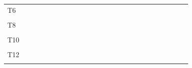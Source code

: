 \documentclass[
]{article}
\begin{document}
\begin{longtable}[l]{lllllllllllllllllllllllll}
\addlinespace
T6 &  &  &  &  &  &  &  &  &  &  &  &  &  &  &  &  &  &  &  &  &  &  &  & \\
\cellcolor{gray!6}{T7} & \cellcolor{gray!6}{} & \cellcolor{gray!6}{} & \cellcolor{gray!6}{} & \cellcolor{gray!6}{} & \cellcolor{gray!6}{} & \cellcolor{gray!6}{} & \cellcolor{gray!6}{} & \cellcolor{gray!6}{} & \cellcolor{gray!6}{} & \cellcolor{gray!6}{} & \cellcolor{gray!6}{} & \cellcolor{gray!6}{} & \cellcolor{gray!6}{} & \cellcolor{gray!6}{} & \cellcolor{gray!6}{} & \cellcolor{gray!6}{} & \cellcolor{gray!6}{} & \cellcolor{gray!6}{} & \cellcolor{gray!6}{} & \cellcolor{gray!6}{} & \cellcolor{gray!6}{} & \cellcolor{gray!6}{} & \cellcolor{gray!6}{} & \cellcolor{gray!6}{}\\
T8 &  &  &  &  &  &  &  &  &  &  &  &  &  &  &  &  &  &  &  &  &  &  &  & \\
\cellcolor{gray!6}{T9} & \cellcolor{gray!6}{} & \cellcolor{gray!6}{} & \cellcolor{gray!6}{} & \cellcolor{gray!6}{} & \cellcolor{gray!6}{} & \cellcolor{gray!6}{} & \cellcolor{gray!6}{} & \cellcolor{gray!6}{} & \cellcolor{gray!6}{} & \cellcolor{gray!6}{} & \cellcolor{gray!6}{} & \cellcolor{gray!6}{} & \cellcolor{gray!6}{} & \cellcolor{gray!6}{} & \cellcolor{gray!6}{} & \cellcolor{gray!6}{} & \cellcolor{gray!6}{} & \cellcolor{gray!6}{} & \cellcolor{gray!6}{} & \cellcolor{gray!6}{} & \cellcolor{gray!6}{} & \cellcolor{gray!6}{} & \cellcolor{gray!6}{} & \cellcolor{gray!6}{}\\
T10 &  &  &  &  &  &  &  &  &  &  &  &  &  &  &  &  &  &  &  &  &  &  &  & \\
\addlinespace
\cellcolor{gray!6}{T11} & \cellcolor{gray!6}{} & \cellcolor{gray!6}{} & \cellcolor{gray!6}{} & \cellcolor{gray!6}{} & \cellcolor{gray!6}{} & \cellcolor{gray!6}{} & \cellcolor{gray!6}{} & \cellcolor{gray!6}{} & \cellcolor{gray!6}{} & \cellcolor{gray!6}{} & \cellcolor{gray!6}{} & \cellcolor{gray!6}{} & \cellcolor{gray!6}{} & \cellcolor{gray!6}{} & \cellcolor{gray!6}{} & \cellcolor{gray!6}{} & \cellcolor{gray!6}{} & \cellcolor{gray!6}{} & \cellcolor{gray!6}{} & \cellcolor{gray!6}{} & \cellcolor{gray!6}{} & \cellcolor{gray!6}{} & \cellcolor{gray!6}{} & \cellcolor{gray!6}{}\\
T12 &  &  &  &  &  &  &  &  &  &  &  &  &  &  &  &  &  &  &  &  &  &  &  & \\
\cellcolor{gray!6}{T13} & \cellcolor{gray!6}{} & \cellcolor{gray!6}{} & \cellcolor{gray!6}{} & \cellcolor{gray!6}{} & \cellcolor{gray!6}{} & \cellcolor{gray!6}{} & \cellcolor{gray!6}{} & \cellcolor{gray!6}{} & \cellcolor{gray!6}{} & \cellcolor{gray!6}{} & \cellcolor{gray!6}{} & \cellcolor{gray!6}{} & \cellcolor{gray!6}{} & \cellcolor{gray!6}{} & \cellcolor{gray!6}{} & \cellcolor{gray!6}{} & \cellcolor{gray!6}{} & \cellcolor{gray!6}{} & \cellcolor{gray!6}{} & \cellcolor{gray!6}{} & \cellcolor{gray!6}{} & \cellcolor{gray!6}{} & \cellcolor{gray!6}{} & \cellcolor{gray!6}{}\\

\end{longtable}
\end{document}
